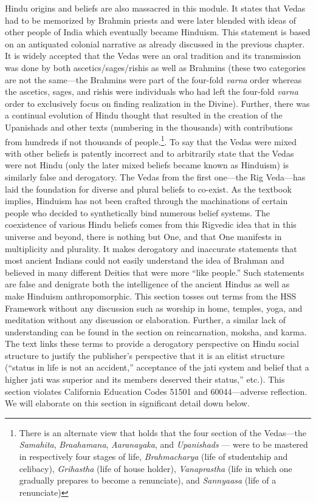 Hindu origins and beliefs are also massacred in this module. It states that Vedas had to be memorized by Brahmin priests and were later blended with ideas of other people of India which eventually became Hinduism. This statement is based on an antiquated colonial narrative as already discussed in the previous chapter. It is widely accepted that the Vedas were an oral tradition and its transmission was done by both ascetics/sages/rishis as well as Brahmins (these two categories are not the same—the Brahmins were part of the four-fold \textit{varna}  order whereas the ascetics, sages, and rishis were individuals who had left the four-fold \textit{varna}  order to exclusively focus on finding realization in the Divine). Further, there was a continual evolution of Hindu thought that resulted in the creation of the Upanishads and other texts (numbering in the thousands) with contributions from hundreds if not thousands of people.\footnote{There is an alternate view that holds that the four section of the 	Vedas—the \textit{Samahita}, \textit{Braahamana}, \textit{Aaranayaka}, and \textit{Upanishads} — were to be mastered in respectively four stages of life, \textit{Brahmacharya} (life of studentship and celibacy), \textit{Grihastha} (life of house holder), \textit{Vanaprastha} (life in which one gradually prepares to become a renunciate), and \textit{Sannyaasa} (life of a renunciate)}. To say that the Vedas were mixed with other beliefs is patently incorrect and to arbitrarily state that the Vedas were not Hindu (only the later mixed beliefs became known as Hinduism) is similarly false and derogatory. The Vedas from the first one—the Rig Veda—has laid the foundation for diverse and plural beliefs to co-exist. As the textbook implies, Hinduism has not been crafted through the machinations of certain people who decided to synthetically bind numerous belief systems. The coexistence of various Hindu beliefs comes from this Rigvedic idea that in this universe and beyond, there is nothing but One, and that One manifests in multiplicity and plurality. It makes derogatory and inaccurate statements that most ancient Indians could not easily understand the idea of Brahman and believed in many different Deities that were more “like people.” Such statements are false and denigrate both the intelligence of the ancient Hindus as well as make Hinduism anthropomorphic. This section tosses out terms from the HSS Framework without any discussion such as worship in home, temples, yoga, and meditation without any discussion or elaboration. Further, a similar lack of understanding can be found in the section on reincarnation, moksha, and karma. The text links these terms to provide a derogatory perspective on Hindu social structure to justify the publisher’s perspective that it is an elitist structure (“status in life is not an accident,” acceptance of the jati system and belief that a higher jati was superior and its members deserved their status,” etc.). This section violates California Education Codes 51501 and 60044—adverse reflection. We will elaborate on this section in significant detail down below.  

